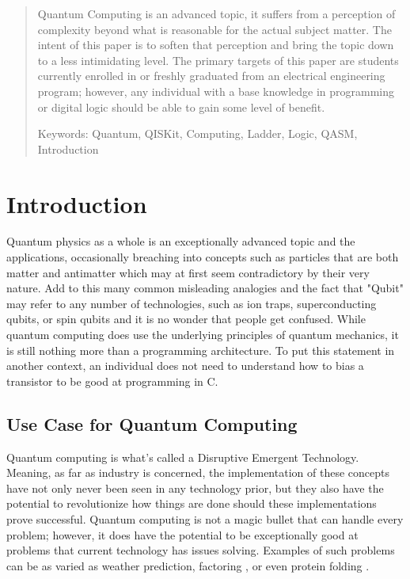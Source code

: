 \documentclass[a4paper]{article}
\newcommand{\tabhere}{} %
\begin{document}
	\begin{abstract}
		
		Quantum Computing is an advanced topic, it suffers from a perception of complexity beyond what is reasonable for the actual subject matter.  The intent of this paper is to soften that perception and bring the topic down to a less intimidating level.  The primary targets of this paper are students currently enrolled in or freshly graduated from an electrical engineering program; however, any individual with a base knowledge in programming or digital logic should be able to gain some level of benefit. 
		
		Keywords:  Quantum, QISKit, Computing, Ladder, Logic, QASM, Introduction
	\end{abstract}
\newpage
\section{Introduction}
\label{sec:introduction}
\tabhere Quantum physics as a whole is an exceptionally advanced topic and the applications, occasionally breaching into concepts such as particles that are both matter and antimatter\cite{mindBoggle} which may at first seem contradictory by their very nature.  Add to this many common misleading analogies and the fact that "Qubit" may refer to any number of technologies, such as ion traps, superconducting qubits, or spin qubits and it is no wonder that people get confused.  While quantum computing does use the underlying principles of quantum mechanics, it is still nothing more than a programming architecture.  To put this statement in another context, an individual does not need to understand how to bias a transistor to be good at programming in C.

\subsection{Use Case for Quantum Computing} 
\tabhere Quantum computing is what's called a Disruptive Emergent Technology.  Meaning, as far as industry is concerned, the implementation of these concepts have not only never been seen in any technology prior, but they also have the potential to revolutionize how things are done should these implementations prove successful.  Quantum computing is not a magic bullet that can handle every problem; however, it does have the potential to be exceptionally good at problems that current technology has issues solving.  Examples of such problems can be as varied as weather prediction, factoring \cite{shorsAlgorithm}, or even protein folding \cite{dwavepfold}. 
\end{document}
